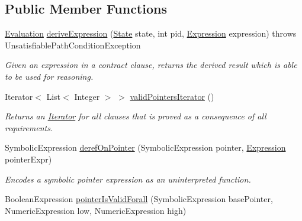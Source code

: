 \subsection*{Public Member Functions}
\begin{DoxyCompactItemize}
\item 
\hyperlink{classedu_1_1udel_1_1cis_1_1vsl_1_1civl_1_1semantics_1_1IF_1_1Evaluation}{Evaluation} \hyperlink{interfaceedu_1_1udel_1_1cis_1_1vsl_1_1civl_1_1semantics_1_1IF_1_1ContractConditionGenerator_a30aba4cb2119513ae71e804e08a30e17}{derive\+Expression} (\hyperlink{interfaceedu_1_1udel_1_1cis_1_1vsl_1_1civl_1_1state_1_1IF_1_1State}{State} state, int pid, \hyperlink{interfaceedu_1_1udel_1_1cis_1_1vsl_1_1civl_1_1model_1_1IF_1_1expression_1_1Expression}{Expression} expression)  throws Unsatisfiable\+Path\+Condition\+Exception
\begin{DoxyCompactList}\small\item\em Given an expression in a contract clause, returns the derived result which is able to be used for reasoning. \end{DoxyCompactList}\item 
Iterator$<$ List$<$ Integer $>$ $>$ \hyperlink{interfaceedu_1_1udel_1_1cis_1_1vsl_1_1civl_1_1semantics_1_1IF_1_1ContractConditionGenerator_a6f795c734166027b219e0e04a7e86a85}{valid\+Pointers\+Iterator} ()
\begin{DoxyCompactList}\small\item\em Returns an \hyperlink{}{Iterator} for all  clauses that is proved as a consequence of all requirements. \end{DoxyCompactList}\item 
Symbolic\+Expression \hyperlink{interfaceedu_1_1udel_1_1cis_1_1vsl_1_1civl_1_1semantics_1_1IF_1_1ContractConditionGenerator_ab52c6625e0b3b7130d70df4b1c5b24e0}{deref\+On\+Pointer} (Symbolic\+Expression pointer, \hyperlink{interfaceedu_1_1udel_1_1cis_1_1vsl_1_1civl_1_1model_1_1IF_1_1expression_1_1Expression}{Expression} pointer\+Expr)
\begin{DoxyCompactList}\small\item\em Encodes a symbolic pointer expression as an uninterpreted function. \end{DoxyCompactList}\item 
Boolean\+Expression \hyperlink{interfaceedu_1_1udel_1_1cis_1_1vsl_1_1civl_1_1semantics_1_1IF_1_1ContractConditionGenerator_a6d1656c5bb0c9b1217066dd7698ea5d8}{pointer\+Is\+Valid\+Forall} (Symbolic\+Expression base\+Pointer, Numeric\+Expression low, Numeric\+Expression high)

\end{DoxyCompactItemize}
